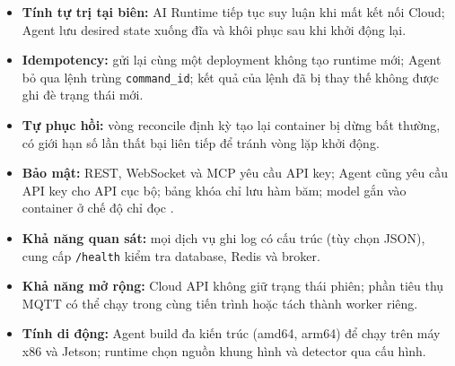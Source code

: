 \begin{itemize}
  \item \textbf{Tính tự trị tại biên:} AI Runtime tiếp tục suy luận khi mất kết nối
        Cloud; Agent lưu desired state xuống đĩa và khôi phục sau khi khởi động lại.
  \item \textbf{Idempotency:} gửi lại cùng một deployment không tạo runtime mới;
        Agent bỏ qua lệnh trùng \texttt{command\_id}; kết quả của lệnh đã bị thay
        thế không được ghi đè trạng thái mới.
  \item \textbf{Tự phục hồi:} vòng reconcile định kỳ tạo lại container bị dừng bất
        thường, có giới hạn số lần thất bại liên tiếp để tránh vòng lặp khởi động.
  \item \textbf{Bảo mật:} REST, WebSocket và MCP yêu cầu API key; Agent cũng yêu
        cầu API key cho API cục bộ; bảng khóa chỉ lưu hàm băm; model gắn vào
        container ở chế độ chỉ đọc \cite{nist800207}.
  \item \textbf{Khả năng quan sát:} mọi dịch vụ ghi log có cấu trúc (tùy chọn
        JSON), cung cấp \texttt{/health} kiểm tra database, Redis và broker.
  \item \textbf{Khả năng mở rộng:} Cloud API không giữ trạng thái phiên; phần tiêu
        thụ MQTT có thể chạy trong cùng tiến trình hoặc tách thành worker riêng.
  \item \textbf{Tính di động:} Agent build đa kiến trúc (amd64, arm64) để chạy
        trên máy x86 và Jetson; runtime chọn nguồn khung hình và detector qua cấu hình.
\end{itemize}
